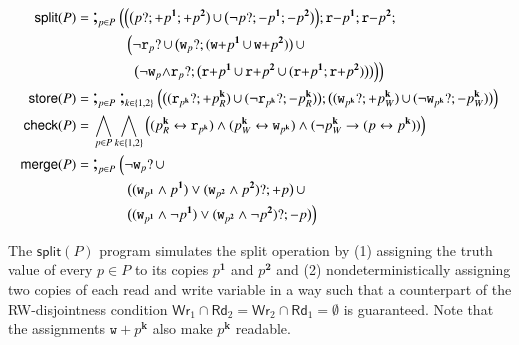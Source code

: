 \documentclass{llncs}
\newcommand{\progStore}{\mathsf{store}}
\newcommand{\progOkChange}{\mathsf{check}}
\newcommand{\progsplit}{\mathsf{split}}
\newcommand{\progmerge}{\mathsf{merge}}
\newcommand{\cp}[2]{{#2}^\mathbf{#1}}
\newcommand{\cpr}[2]{\cp{#1}{#2}_R}
\newcommand{\cpw}[2]{\cp{#1}{#2}_W}
\newcommand{\readable}[1]{\mathtt{r}_{#1}}
\newcommand{\readset}{\mathsf{Rd}}
\newcommand{\writable}[1]{\mathtt{w}_{#1}}
\newcommand{\writeset}{\mathsf{Wr}}
\newcommand{\testpdl}{?}				%
\newcommand{\assgntopR}[1]{{\mathtt r {+} #1}}
\newcommand{\assgnbotR}[1]{{\mathtt r {-} #1}}
\newcommand{\assgntopW}[1]{{\mathtt w {+} #1}}
\newcommand{\assgntopV}[1]{{\mathtt {+} #1}}
\newcommand{\assgnbotV}[1]{{\mathtt {-} #1}}
\newcommand{\assgnpropV}[2]{(#1 \testpdl ; \assgntopV{#2}) \ndet (\lnot #1 \testpdl ; \assgnbotV{#2})}
\newcommand{\leqv}{ \leftrightarrow }
\newcommand{\limp}{ \rightarrow }
\newcommand{\ndet}{\,{\cup}\,}
\newcommand{\propset}{\mathbb P}
\newcommand{\seqseq}[1]{ \text{\Large ;}_{#1} ~ }
\newcommand{\set}[1]{\{#1\}}
\begin{document}
\begin{table}[t]
\begin{align*}
\progsplit(P) =&\ \seqseq{p \in P} \Big( 
\Big(
  \big( p \testpdl ; \assgntopV{ \cp{1}{p} } ; \assgntopV{ \cp{2}{p} } \big) \ndet 
  \big( \lnot p \testpdl ; \assgnbotV{ \cp{1}{p} } ; \assgnbotV{ \cp{2}{p} } \big) 
\Big) ; \assgnbotR{\cp 1 {p}} ; \assgnbotR{\cp 2 {p}} ;
\\& ~~~~~~~~~~~
\Big(
  \lnot \readable p  \testpdl \ndet
  \big(\writable{p} \testpdl ; ( \assgntopW{\cp 1 {p}} \ndet \assgntopW{\cp 2 {p}} ) \big) 			 \ndet
  \\& ~~~~~~~~~~~~~
  \big(\lnot \writable{p} {\land} \readable p  \testpdl ; \big( \assgntopR{\cp 1 {p}} \ndet \assgntopR{\cp 2 {p}} \ndet 
																			  (\assgntopR{\cp 1 {p}}  ; \assgntopR{\cp 2 {p}}) \big) \big) 
\Big)
\Big)
\\
\progStore(P) =&\ \seqseq{p \in P} \seqseq{k \in \{1, 2\}} \Big(
  \big( \assgnpropV{\readable{\cp k p}}{\cpr k p} \big) ; \big( \assgnpropV{\writable{\cp k p}}{\cpw k p} \big)
\Big)
\\
\progOkChange(P) =&\ \bigwedge_{p \in P} \bigwedge_{k \in \{1, 2\}} \Big(
( \cpr k p \leqv \readable{ \cp k {p} } ) 	\land 
( \cpw k p \leqv \writable{ \cp k {p} } ) 	\land 	
( \lnot \cpw k {p} \limp (p \leqv \cp k {p}) )
\Big)
\\
\progmerge(P) =&\ \seqseq{p \in P} \Big( 
\lnot \writable{p} \testpdl \ndet 
\\& ~~~~~~~~~~~ 
\big(	(\writable{ \cp{1}{p} } \land \cp{1}{p}) \lor 
		(\writable{ \cp{2}{p} } \land \cp{2}{p}) \testpdl ; \assgntopV p \big) \ndet 
\\& ~~~~~~~~~~~ 
\big(	(\writable{ \cp{1}{p} } \land \lnot \cp{1}{p}) \lor 
		(\writable{ \cp{2}{p} } \land \lnot \cp{2}{p}) \testpdl ; \assgnbotV p \big) 
\Big)
\end{align*}
\caption{Useful programs, for $P \subseteq \propset$ %
\label{fig:useful_programs}
}
\end{table}

The $\progsplit(P)$ program simulates the split operation by 
(1) assigning the truth value of every $p \in P$ to its copies $\cp 1 p$ and $\cp 2 p$ and
(2) nondeterministically assigning
two copies of each read and write variable in a way such that a counterpart of the RW-disjointness condition
$\writeset_1 \cap \readset_2 = \writeset_2 \cap \readset_1 = \emptyset$ is guaranteed.  
Note that the assignments $\assgntopW{ \cp{k}{p} }$ also make $\cp{k}{p} $ readable.
\end{document}

